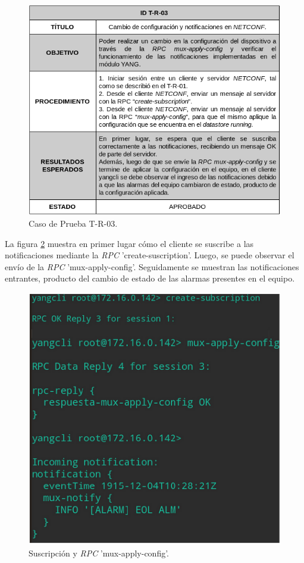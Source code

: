\begin{figure}[H]
	\centering
	\includegraphics[scale=0.6]{Figures/test3.png}
	\caption{Caso de Prueba T-R-03.}
	\label{fig:test3}
  \end{figure}

  La figura \ref{fig:test3_consulta} muestra en primer lugar cómo el cliente se suscribe a las notificaciones mediante la  \textit{RPC} 'create-suscription'. Luego, se puede observar el envío de la  \textit{RPC} 'mux-apply-config'. Seguidamente se muestran las notificaciones entrantes, producto del cambio de estado de las alarmas presentes en el equipo.
  
  \begin{figure}[H]
	\centering
	\includegraphics[scale=0.6]{Figures/test3_consulta.png}
	\caption{Suscripción y  \textit{RPC} 'mux-apply-config'.}
	\label{fig:test3_consulta}
  \end{figure}



